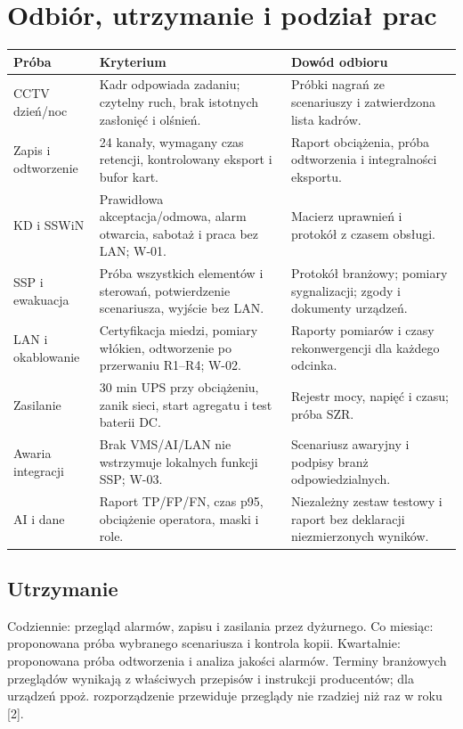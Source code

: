 \section{Odbiór, utrzymanie i podział prac}
\begingroup\small
\begin{tabularx}{\linewidth}{@{}P{24mm}Y Y@{}}
\toprule\textbf{Próba} & \textbf{Kryterium} & \textbf{Dowód odbioru}\\\midrule
CCTV dzień/noc & Kadr odpowiada zadaniu; czytelny ruch, brak istotnych zasłonięć i olśnień. & Próbki nagrań ze scenariuszy i zatwierdzona lista kadrów.\\
Zapis i odtworzenie & 24 kanały, wymagany czas retencji, kontrolowany eksport i bufor kart. & Raport obciążenia, próba odtworzenia i integralności eksportu.\\
KD i SSWiN & Prawidłowa akceptacja/odmowa, alarm otwarcia, sabotaż i praca bez LAN; W-01. & Macierz uprawnień i protokół z czasem obsługi.\\
SSP i ewakuacja & Próba wszystkich elementów i sterowań, potwierdzenie scenariusza, wyjście bez LAN. & Protokół branżowy; pomiary sygnalizacji; zgody i dokumenty urządzeń.\\
LAN i okablowanie & Certyfikacja miedzi, pomiary włókien, odtworzenie po przerwaniu R1--R4; W-02. & Raporty pomiarów i czasy rekonwergencji dla każdego odcinka.\\
Zasilanie & 30 min UPS przy obciążeniu, zanik sieci, start agregatu i test baterii DC. & Rejestr mocy, napięć i czasu; próba SZR.\\
Awaria integracji & Brak VMS/AI/LAN nie wstrzymuje lokalnych funkcji SSP; W-03. & Scenariusz awaryjny i podpisy branż odpowiedzialnych.\\
AI i dane & Raport TP/FP/FN, czas p95, obciążenie operatora, maski i role. & Niezależny zestaw testowy i raport bez deklaracji niezmierzonych wyników.\\\bottomrule
\end{tabularx}
\endgroup

\subsection*{Utrzymanie}
Codziennie: przegląd alarmów, zapisu i zasilania przez dyżurnego. Co miesiąc: proponowana próba wybranego scenariusza i kontrola kopii. Kwartalnie: proponowana próba odtworzenia i analiza jakości alarmów. Terminy branżowych przeglądów wynikają z właściwych przepisów i instrukcji producentów; dla urządzeń ppoż. rozporządzenie przewiduje przeglądy nie rzadziej niż raz w roku [2].

